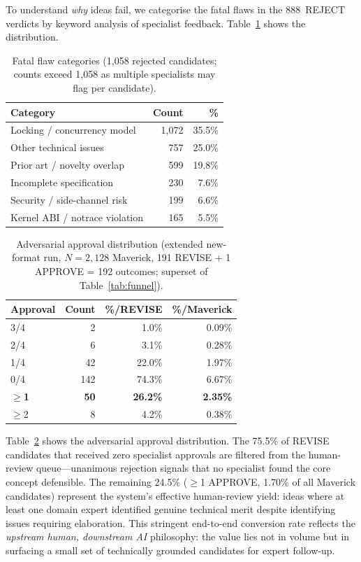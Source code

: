\documentclass[11pt,twocolumn]{article}
\begin{document}
To understand \emph{why} ideas fail, we categorise the fatal flaws
in the 888~REJECT verdicts by keyword analysis of specialist feedback.
Table~\ref{tab:taxonomy} shows the distribution.

\begin{table}[t]
\centering
\small
\caption{Fatal flaw categories (1,058 rejected candidates;
  counts exceed 1,058 as multiple specialists may flag per candidate).}
\label{tab:taxonomy}
\begin{tabular}{lrr}
\toprule
Category & Count & \% \\
\midrule
Locking / concurrency model    & 1,072 & 35.5\% \\
Other technical issues         &   757 & 25.0\% \\
Prior art / novelty overlap    &   599 & 19.8\% \\
Incomplete specification       &   230 &  7.6\% \\
Security / side-channel risk   &   199 &  6.6\% \\
Kernel ABI / notrace violation &   165 &  5.5\% \\
\bottomrule
\end{tabular}
\end{table}

\begin{table}[t]
\centering
\small
\caption{Adversarial approval distribution (extended new-format run,
  $N=2{,}128$ Maverick, 191 REVISE + 1 APPROVE = 192 outcomes; superset of Table~\ref{tab:funnel}).}
\label{tab:approval}
\setlength{\tabcolsep}{4pt}
\begin{tabular}{lrrr}
\toprule
Approval & Count & \%/REVISE & \%/Maverick \\
\midrule
3/4 &  2 &  1.0\% & 0.09\% \\
2/4 &  6 &  3.1\% & 0.28\% \\
1/4 & 42 & 22.0\% & 1.97\% \\
0/4 & 142 & 74.3\% & 6.67\% \\
\midrule
$\geq$\textbf{1} & \textbf{50} & \textbf{26.2\%} & \textbf{2.35\%} \\
$\geq$2 &  8 &  4.2\% & 0.38\%  \\
\bottomrule
\end{tabular}
\end{table}

Table~\ref{tab:approval} shows the adversarial approval distribution.
The 75.5\% of REVISE candidates that received zero specialist approvals
are filtered from the human-review queue---unanimous rejection signals
that no specialist found the core concept defensible.  The remaining
24.5\% ($\geq$1 APPROVE, 1.70\% of all Maverick candidates) represent
the system's effective human-review yield: ideas where at least one
domain expert identified genuine technical merit despite identifying
issues requiring elaboration.  This stringent end-to-end conversion
rate reflects the \emph{upstream human, downstream AI} philosophy: the value lies not
in volume but in surfacing a small set of technically grounded
candidates for expert follow-up.
\end{document}
